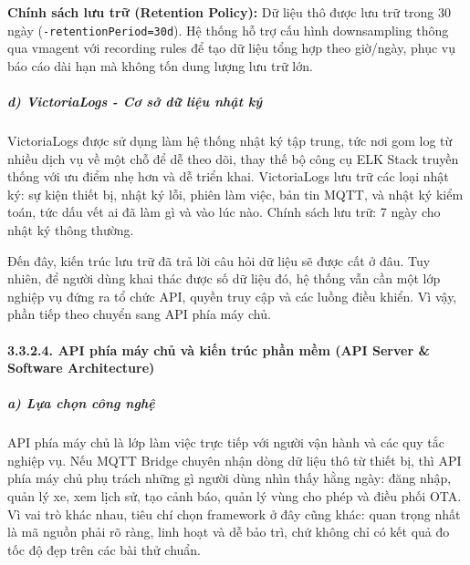 \documentclass[a4paper]{extarticle}
\begin{document}
\textbf{Chính sách lưu trữ (Retention Policy):} Dữ liệu thô được lưu trữ
trong 30 ngày (\texttt{-retentionPeriod=30d}). Hệ thống hỗ trợ cấu hình
downsampling thông qua vmagent với recording rules để tạo dữ liệu tổng
hợp theo giờ/ngày, phục vụ báo cáo dài hạn mà không tốn dung lượng lưu
trữ lớn.

\subparagraph{d) VictoriaLogs - Cơ sở dữ liệu nhật
ký}\label{d-victorialogs---cux1a1-sux1edf-dux1eef-liux1ec7u-nhux1eadt-kuxfd}

VictoriaLogs được sử dụng làm hệ thống nhật ký tập trung, tức nơi gom log
từ nhiều dịch vụ về một chỗ để dễ theo dõi, thay thế bộ công cụ ELK
Stack truyền thống với ưu điểm nhẹ hơn và dễ triển khai. VictoriaLogs
lưu trữ các loại nhật ký: sự kiện thiết bị, nhật ký lỗi, phiên làm việc,
bản tin MQTT, và nhật ký kiểm toán,
tức dấu vết ai đã làm gì và vào lúc nào. Chính sách lưu trữ: 7 ngày cho nhật ký thông thường.

Đến đây, kiến trúc lưu trữ đã trả lời câu hỏi dữ liệu sẽ được cất ở đâu.
Tuy nhiên, để người dùng khai thác được số dữ liệu đó, hệ thống vẫn cần
một lớp nghiệp vụ đứng ra tổ chức API, quyền truy cập và các luồng điều
khiển. Vì vậy, phần tiếp theo chuyển sang API phía máy chủ.

\paragraph{3.3.2.4. API phía máy chủ và kiến trúc phần mềm (API Server \&
Software
Architecture)}\label{3234-api-server-vuxe0-kiux1ebfn-truxfac-phux1ea7n-mux1ec1m-api-server--software-architecture}

\subparagraph{a) Lựa chọn công
nghệ}\label{a-lux1ef1a-chux1ecdn-cuxf4ng-nghux1ec7}

API phía máy chủ là lớp làm việc trực tiếp với người vận hành và các quy tắc
nghiệp vụ. Nếu MQTT Bridge chuyên nhận dòng dữ liệu thô từ thiết bị, thì
API phía máy chủ phụ trách những gì người dùng nhìn thấy hằng ngày: đăng nhập,
quản lý xe, xem lịch sử, tạo cảnh báo, quản lý vùng cho phép và điều phối
OTA. Vì vai trò khác nhau, tiêu chí chọn framework ở đây cũng khác:
quan trọng nhất là mã nguồn phải rõ ràng, linh hoạt và dễ bảo trì, chứ
không chỉ có kết quả đo tốc độ đẹp trên các bài thử chuẩn.
\end{document}
